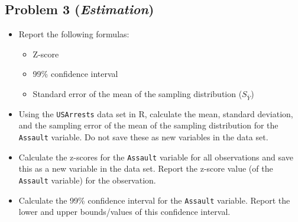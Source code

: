 \documentclass{article}
\begin{document}
\subsection*{Problem 3 (\textit{Estimation})}
\begin{itemize}
\item Report the following formulas: 
	\begin{itemize}
	\item Z-score
	\item 99\% confidence interval
	\item Standard error of the mean of the sampling distribution ($S_{\bar{Y}}$)
	\end{itemize}
\item Using the \texttt{USArrests} data set in R, calculate the mean, standard deviation, and the sampling error of the mean of the sampling distribution for the \texttt{Assault} variable. Do not save these as new variables in the data set.
\item Calculate the z-scores for the \texttt{Assault} variable for all observations and save this as a new variable in the data set. Report the z-score value (of the \texttt{Assault} variable) for the  observation.
\item Calculate the 99\% confidence interval for the \texttt{Assault} variable. Report the lower and upper bounds/values of this confidence interval. 
\end{itemize}
\end{document}
